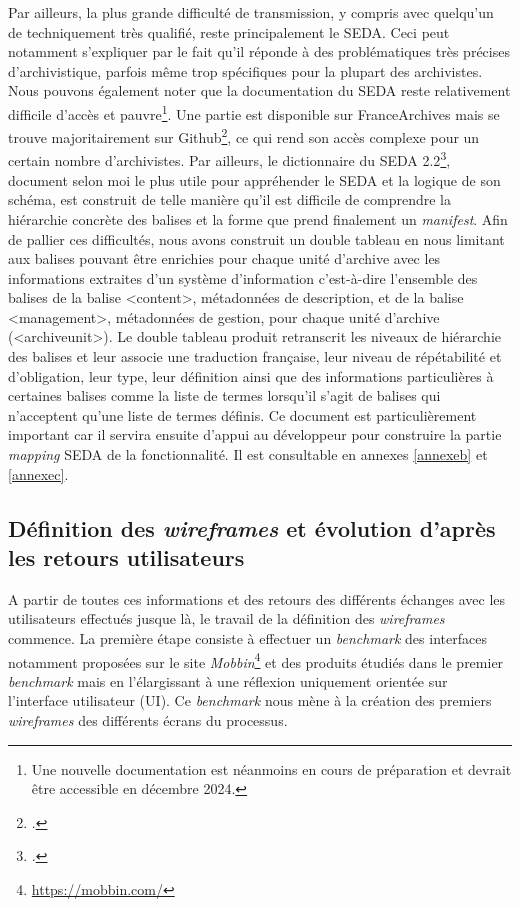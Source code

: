 Par ailleurs, la plus grande difficulté de transmission, y compris avec quelqu’un de techniquement très qualifié, reste principalement le \gls{SEDA}. Ceci peut notamment s’expliquer par le fait qu’il réponde à des problématiques très précises d’archivistique, parfois même trop spécifiques pour la plupart des archivistes. Nous pouvons également noter que la documentation du \gls{SEDA} reste relativement difficile d’accès et pauvre\footnote{Une nouvelle documentation est néanmoins en cours de préparation et devrait être accessible en décembre 2024.}. Une partie est disponible sur FranceArchives mais se trouve majoritairement sur Github\footcite{noauthor_culturecommunicationseda_2024}, ce qui rend son accès complexe pour un certain nombre d’archivistes. Par ailleurs, le dictionnaire du \gls{SEDA} 2.2\footcite{siaf_dictionnaire_2022}, document selon moi le plus utile pour appréhender le \gls{SEDA} et la logique de son schéma, est construit de telle manière qu’il est difficile de comprendre la hiérarchie concrète des balises et la forme que prend finalement un \textit{\gls{manifest}}. Afin de pallier ces difficultés, nous avons construit un double tableau en nous limitant aux balises pouvant être enrichies pour chaque unité d’archive avec les informations extraites d’un système d’information c’est-à-dire l’ensemble des balises de la balise <content>, métadonnées de description, et de la balise <management>, métadonnées de gestion, pour chaque unité d’archive (<archiveunit>). Le double tableau produit retranscrit les niveaux de hiérarchie des balises et leur associe une traduction française, leur niveau de répétabilité et d’obligation, leur type, leur définition ainsi que des informations particulières à certaines balises comme la liste de termes lorsqu’il s’agit de balises qui n’acceptent qu’une liste de termes définis. Ce document est particulièrement important car il servira ensuite d’appui au développeur pour construire la partie \textit{\gls{mapping}} \gls{SEDA} de la fonctionnalité. Il est consultable en annexes \ref{annexeb} et \ref{annexec}. 


\subsection{Définition des \textit{wireframes} et évolution d’après les retours utilisateurs}

A partir de toutes ces informations et des retours des différents échanges avec les utilisateurs effectués jusque là, le travail de la définition des \textit{\gls{wireframe}s} commence. La première étape consiste à effectuer un \textit{\gls{benchmark}} des interfaces notamment proposées sur le site \textit{Mobbin}\footnote{\href{https://mobbin.com/}{https://mobbin.com/}} et des produits étudiés dans le premier \textit{\gls{benchmark}} mais en l’élargissant à une réflexion uniquement orientée sur l’interface utilisateur (\gls{UI}). Ce \textit{\gls{benchmark}} nous mène à la création des premiers \textit{\gls{wireframe}s} des différents écrans du processus. 


